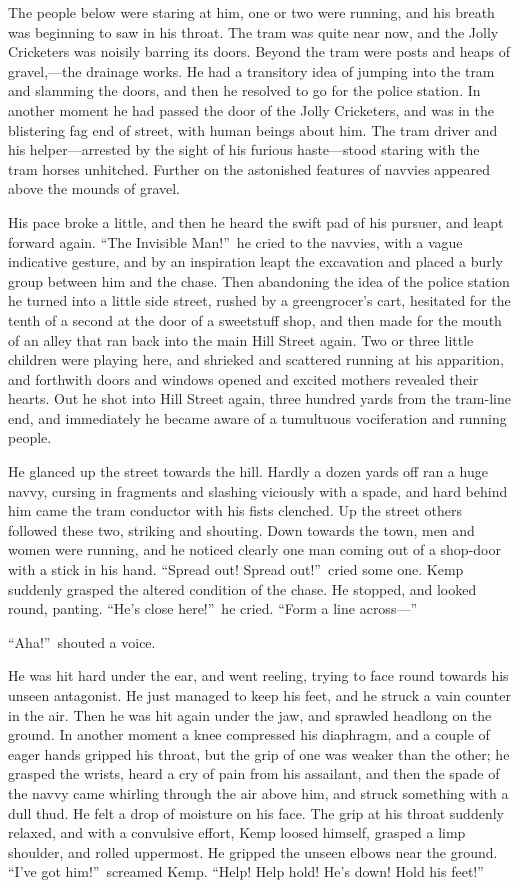 The people below were staring at him, one or two were running, and his breath was beginning to saw in his throat. The tram was quite near now, and the Jolly Cricketers was noisily barring its doors. Beyond the tram were posts and heaps of gravel,—the drainage works. He had a transitory idea of jumping into the tram and slamming the doors, and then he resolved to go for the police station. In another moment he had passed the door of the Jolly Cricketers, and was in the blistering fag end of street, with human beings about him. The tram driver and his helper—arrested by the sight of his furious haste—stood staring with the tram horses unhitched. Further on the astonished features of navvies appeared above the mounds of gravel.

His pace broke a little, and then he heard the swift pad of his pursuer, and leapt forward again. “The Invisible Man!”\ he cried to the navvies, with a vague indicative gesture, and by an inspiration leapt the excavation and placed a burly group between him and the chase. Then abandoning the idea of the police station he turned into a little side street, rushed by a greengrocer’s cart, hesitated for the tenth of a second at the door of a sweetstuff shop, and then made for the mouth of an alley that ran back into the main Hill Street again. Two or three little children were playing here, and shrieked and scattered running at his apparition, and forthwith doors and windows opened and excited mothers revealed their hearts. Out he shot into Hill Street again, three hundred yards from the tram-line end, and immediately he became aware of a tumultuous vociferation and running people.

He glanced up the street towards the hill. Hardly a dozen yards off ran a huge navvy, cursing in fragments and slashing viciously with a spade, and hard behind him came the tram conductor with his fists clenched. Up the street others followed these two, striking and shouting. Down towards the town, men and women were running, and he noticed clearly one man coming out of a shop-door with a stick in his hand. “Spread out! Spread out!”\ cried some one. Kemp suddenly grasped the altered condition of the chase. He stopped, and looked round, panting. “He’s close here!”\ he cried. “Form a line across—”

“Aha!”\ shouted a voice.

He was hit hard under the ear, and went reeling, trying to face round towards his unseen antagonist. He just managed to keep his feet, and he struck a vain counter in the air. Then he was hit again under the jaw, and sprawled headlong on the ground. In another moment a knee compressed his diaphragm, and a couple of eager hands gripped his throat, but the grip of one was weaker than the other; he grasped the wrists, heard a cry of pain from his assailant, and then the spade of the navvy came whirling through the air above him, and struck something with a dull thud. He felt a drop of moisture on his face. The grip at his throat suddenly relaxed, and with a convulsive effort, Kemp loosed himself, grasped a limp shoulder, and rolled uppermost. He gripped the unseen elbows near the ground. “I’ve got him!”\ screamed Kemp. “Help! Help hold! He’s down! Hold his feet!”

